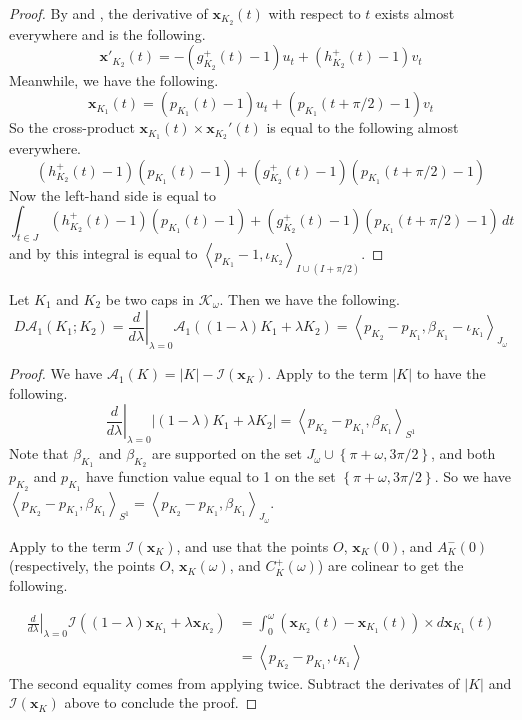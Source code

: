 \begin{proof}
By  and , the derivative of \(\mathbf{x}_{K_2}(t)\) with respect to \(t\) exists almost everywhere and is the following.
\[
\mathbf{x}'_{K_2}(t) = -(g_{K_2}^+(t) - 1) u_t + (h_{K_2}^+(t) - 1) v_t
\]
Meanwhile, we have the following.
\[
\mathbf{x}_{K_1}(t) = (p_{K_1} (t) - 1) u_t + 
(p_{K_1} (t + \pi / 2) - 1) v_t
\]
So the cross-product \(\mathbf{x}_{K_1}(t) \times \mathbf{x}_{K_2}'(t)\) is equal to the following almost everywhere.
\[
(h_{K_2}^+(t) - 1) (p_{K_1} (t) - 1) + (g_{K_2}^+(t) - 1) (p_{K_1} (t + \pi / 2) - 1)
\]
Now the left-hand side is equal to
\[
\int_{t \in J} (h_{K_2}^+(t) - 1) (p_{K_1} (t) - 1) + (g_{K_2}^+(t) - 1) (p_{K_1} (t + \pi / 2) - 1) \, dt
\]
and by  this integral is equal to \(\left< p_{K_1} - 1, \iota_{K_2} \right>_{I \cup (I + \pi/2)}\).
\end{proof}

\begin{theorem}

Let \(K_1\) and \(K_2\) be two caps in \(\mathcal{K}_{\omega}\). Then we have the following.
\[
D\mathcal{A}_1(K_1; K_2) = \left. \frac{d}{d\lambda} \right|_{\lambda = 0} \mathcal{A}_1((1 - \lambda) K_1 + \lambda K_2)
= \left< p_{K_2} - p_{K_1}, \beta_{K_1} - \iota_{K_1} \right>_{J_\omega}
\]

\label{thm:variation-a1}
\end{theorem}

\begin{proof}
We have \(\mathcal{A}_1(K) = |K| - \mathcal{I}(\mathbf{x}_K)\). Apply  to the term \(|K|\) to have the following.
\[
\left. \frac{d}{d \lambda} \right|_{\lambda=0} \left| (1-\lambda) K_1 + \lambda K_2 \right|  = \left< p_{K_2} - p_{K_1} , \beta_{K_1} \right>_{S^1}
\]
Note that \(\beta_{K_1}\) and \(\beta_{K_2}\) are supported on the set \(J_\omega \cup \left\{ \pi + \omega, 3\pi/2 \right\}\), and both \(p_{K_2}\) and \(p_{K_1}\) have function value equal to 1 on the set \(\left\{ \pi + \omega, 3\pi/2 \right\}\). So we have \(\left< p_{K_2} - p_{K_1} , \beta_{K_1} \right>_{S^1} = \left< p_{K_2} - p_{K_1} , \beta_{K_1} \right>_{J_\omega}\).

Apply  to the term \(\mathcal{I}(\mathbf{x}_K)\), and use that the points \(O\), \(\mathbf{x}_{K}(0)\), and \(A^-_K(0)\) (respectively, the points \(O\), \(\mathbf{x}_K(\omega)\), and \(C_K^+(\omega)\)) are colinear to get the following.

\begin{align*}
\left. \frac{d}{d \lambda} \right|_{\lambda = 0} \mathcal{I}((1 - \lambda)\mathbf{x}_{K_1} + \lambda \mathbf{x}_{K_2}) & = \int_0^{\omega} (\mathbf{x}_{K_2}(t) - \mathbf{x}_{K_1}(t)) \times d\mathbf{x}_{K_1}(t) \\
& = \left< p_{K_2} - p_{K_1}, \iota_{K_1} \right> 
\end{align*}
The second equality comes from applying  twice. Subtract the derivates of \(|K|\) and \(\mathcal{I}(\mathbf{x}_K)\) above to conclude the proof.
\end{proof}

